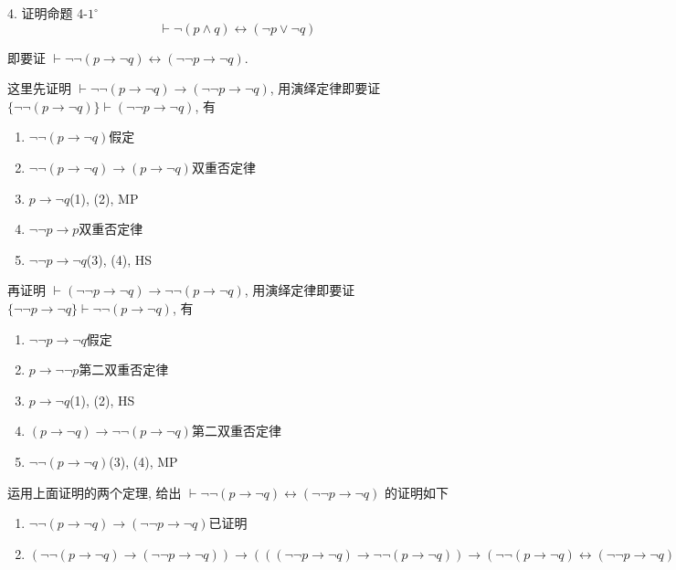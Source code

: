 \documentclass[boxes]{homework}
\begin{document}
\begin{problem}
    4. 证明命题 4-$1^\circ$
    $$
    \vdash \lnot (p\land q) \leftrightarrow (\lnot p\lor \lnot q)
    $$
\end{problem}

\begin{solution}
    即要证 $\vdash \lnot\lnot (p\to \lnot q)\leftrightarrow(\lnot\lnot p\to\lnot q)$.
    
    这里先证明 $\vdash \lnot\lnot (p\to \lnot q)\to(\lnot\lnot p\to\lnot q)$, 用演绎定律即要证 $\{\lnot\lnot(p\to\lnot q)\}\vdash (\lnot\lnot p\to\lnot q)$, 有
    \begin{enumerate}[label = (\arabic*), itemsep = 0em, topsep = .5em, partopsep = .5em]
        \item $\lnot\lnot (p\to \lnot q)$\hfill 假定
        \item $\lnot\lnot (p\to \lnot q)\to (p\to\lnot q)$\hfill 双重否定律
        \item $p\to\lnot q$\hfill (1), (2), MP
        \item $\lnot\lnot p\to p$\hfill 双重否定律
        \item $\lnot\lnot p\to\lnot q$\hfill (3), (4), HS
    \end{enumerate}

    再证明 $\vdash (\lnot\lnot p\to \lnot q)\to\lnot\lnot (p\to\lnot q)$, 用演绎定律即要证 $\{\lnot\lnot p\to\lnot q\}\vdash \lnot\lnot (p\to\lnot q)$, 有
    \begin{enumerate}[label = (\arabic*), itemsep = 0em, topsep = .5em, partopsep = .5em]
        \item $\lnot\lnot p\to\lnot q$\hfill 假定
        \item $p\to\lnot\lnot p$\hfill 第二双重否定律
        \item $p\to\lnot q$\hfill (1), (2), HS
        \item $(p\to\lnot q)\to\lnot\lnot (p\to\lnot q)$\hfill 第二双重否定律
        \item $\lnot\lnot (p\to\lnot q)$\hfill (3), (4), MP
    \end{enumerate}
    
    运用上面证明的两个定理, 给出 $\vdash \lnot\lnot (p\to \lnot q)\leftrightarrow(\lnot\lnot p\to\lnot q)$ 的证明如下
    \begin{enumerate}[label = (\arabic*), itemsep = 0em, topsep = .5em, partopsep = .5em]
        \item $\lnot\lnot (p\to \lnot q)\to(\lnot\lnot p\to\lnot q)$\hfill 已证明
        \item $(\lnot\lnot (p\to \lnot q)\to(\lnot\lnot p\to\lnot q))\to (((\lnot\lnot p\to\lnot q)\to \lnot\lnot (p\to \lnot q))\to (\lnot\lnot (p\to \lnot q)\leftrightarrow(\lnot\lnot p\to\lnot q)))$
        

\end{enumerate}
\end{solution}
\end{document}
